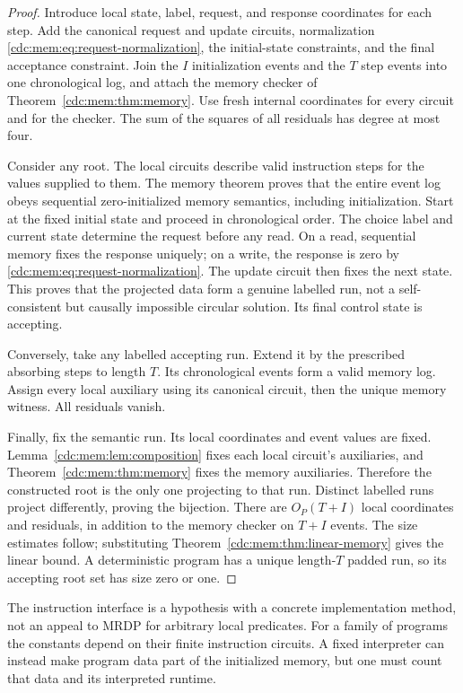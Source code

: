 \documentclass[11pt,a4paper]{article}
\theoremstyle{definition}
\theoremstyle{remark}
\begin{document}
\begin{proof}
Introduce local state, label, request, and response coordinates for each step.
Add the canonical request and update circuits, normalization
\eqref{cdc:mem:eq:request-normalization}, the initial-state constraints, and the final
acceptance constraint. Join the $I$ initialization events and the $T$ step
events into one chronological log, and attach the memory checker of
Theorem~\ref{cdc:mem:thm:memory}. Use fresh internal coordinates for every circuit and
for the checker. The sum of the squares of all residuals has degree at most
four.

Consider any root. The local circuits describe valid instruction steps for the
values supplied to them. The memory theorem proves that the entire event log
obeys sequential zero-initialized memory semantics, including initialization.
Start at the fixed initial state and proceed in chronological order. The
choice label and current state determine the request before any read. On a
read, sequential memory fixes the response uniquely; on a write, the response
is zero by \eqref{cdc:mem:eq:request-normalization}. The update circuit then fixes the
next state. This proves that the projected data form a genuine labelled run,
not a self-consistent but causally impossible circular solution. Its final
control state is accepting.

Conversely, take any labelled accepting run. Extend it by the prescribed
absorbing steps to length $T$. Its chronological events form a valid memory
log. Assign every local auxiliary using its canonical circuit, then the unique
memory witness. All residuals vanish.

Finally, fix the semantic run. Its local coordinates and event values are
fixed. Lemma~\ref{cdc:mem:lem:composition} fixes each local circuit's auxiliaries, and
Theorem~\ref{cdc:mem:thm:memory} fixes the memory auxiliaries. Therefore the constructed
root is the only one projecting to that run. Distinct labelled runs project
differently, proving the bijection. There are $O_P(T+I)$ local coordinates and
residuals, in addition to the memory checker on $T+I$ events. The size estimates
follow; substituting Theorem~\ref{cdc:mem:thm:linear-memory} gives the linear bound.
A deterministic program has a unique length-$T$ padded run, so its
accepting root set has size zero or one.
\end{proof}

The instruction interface is a hypothesis with a concrete implementation
method, not an appeal to MRDP for arbitrary local predicates. For a family of
programs the constants depend on their finite instruction circuits. A fixed
interpreter can instead make program data part of the initialized memory, but
one must count that data and its interpreted runtime.
\end{document}
